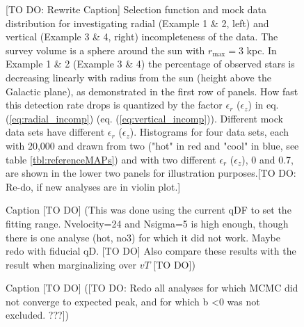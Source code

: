 
\begin{figure}
\caption{[TO DO: Rewrite Caption] Selection function and mock data distribution for investigating radial (Example 1 \& 2, left) and vertical (Example 3 \& 4, right) incompleteness of the data. The survey volume is a sphere around the sun with $r_\text{max} = 3$ kpc. In Example 1 \& 2 (Example 3 \& 4) the percentage of observed stars is decreasing linearly with radius from the sun (height above the Galactic plane), as demonstrated in the first row of panels. How fast this detection rate drops is quantized by the factor $\epsilon_r$ ($\epsilon_z$) in eq. (\ref{eq:radial_incomp}) (eq. (\ref{eq:vertical_incomp})). Different mock data sets have different $\epsilon_r$ ($\epsilon_z$). Histograms for four data sets, each with 20,000 and drawn from two \MAPs ("hot" in red and "cool" in blue, see table \ref{tbl:referenceMAPs}) and with two different $\epsilon_r$ ($\epsilon_z$), 0 and 0.7, are shown in the lower two panels for illustration purposes.[TO DO: Re-do, if new analyses are in violin plot.]} 
\label{fig:incompZ_mockdata}
\end{figure}


\begin{figure}
\caption{Caption [TO DO] (This was done using the current qDF to set the fitting range. Nvelocity=24 and Nsigma=5 is high enough, though there is one analyse (hot, no3) for which it did not work. Maybe redo with fiducial qD. [TO DO] Also compare these results with the result when marginalizing over $vT$ [TO DO])} 
\label{fig:isoSphFlexIncompZ_violins}
\end{figure}

\begin{figure}
\caption{Caption [TO DO] ([TO DO: Redo all analyses for which MCMC did not converge to expected peak, and for which b <0 was not excluded. ???])} 
\label{fig:isoSphFlexIncompZ_violins}
\end{figure}